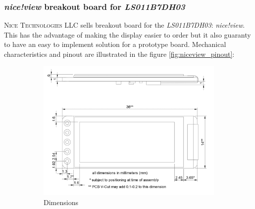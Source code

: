 \documentclass[report.tex]{subfiles}
\begin{document}
\subsubsection{\textit{nice!view} breakout board for \textit{LS011B7DH03}}

\textsc{Nice Technologies LLC} sells breakout board for the \textit{LS011B7DH03}:  \textit{nice!view}. This has the advantage of making the display easier to order but it also guaranty to have an easy to implement solution for a prototype board. Mechanical characteristics and pinout are illustrated in the figure \ref{fig:niceview_pinout}:

\begin{figure}[H]
\begin{subfigure}{.72\textwidth}
	\centering
	\includegraphics[width=1\textwidth]{Include/Figure/comp/niceview_dimensions.png}
	\caption{Dimensions}
	\end{subfigure}
\begin{subfigure}{.23\textwidth}
	\centering

\end{subfigure}
\end{figure}
\end{document}
